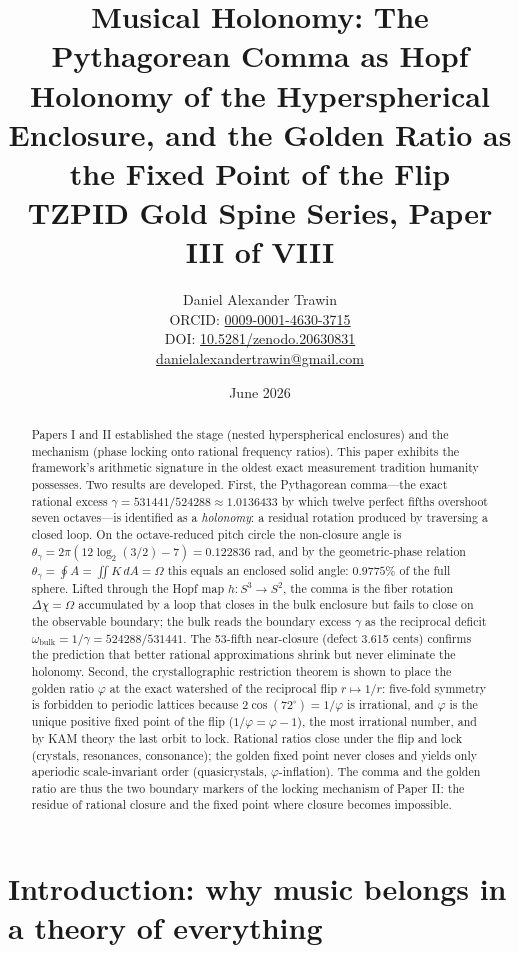 \documentclass[11pt]{article}
\title{Musical Holonomy: The Pythagorean Comma as Hopf Holonomy of the Hyperspherical Enclosure, and the Golden Ratio as the Fixed Point of the Flip\\[0.6em]
\large TZPID Gold Spine Series, Paper III of VIII}
\author{Daniel Alexander Trawin\\
\small ORCID: \href{https://orcid.org/0009-0001-4630-3715}{0009-0001-4630-3715}\\
\small DOI: \href{https://doi.org/10.5281/zenodo.20630831}{10.5281/zenodo.20630831}\\
\small \href{mailto:danielalexandertrawin@gmail.com}{danielalexandertrawin@gmail.com}}
\date{June 2026}
\theoremstyle{remark}
\begin{document}
\maketitle

\begin{abstract}
Papers I and II established the stage (nested hyperspherical enclosures) and the mechanism (phase locking onto rational frequency ratios). This paper exhibits the framework's arithmetic signature in the oldest exact measurement tradition humanity possesses. Two results are developed. First, the Pythagorean comma---the exact rational excess $\gamma = 531441/524288 \approx 1.0136433$ by which twelve perfect fifths overshoot seven octaves---is identified as a \emph{holonomy}: a residual rotation produced by traversing a closed loop. On the octave-reduced pitch circle the non-closure angle is $\theta_\gamma = 2\pi(12\log_2(3/2) - 7) = 0.122836$ rad, and by the geometric-phase relation $\theta_\gamma = \oint A = \iint K\, dA = \Omega$ this equals an enclosed solid angle: $0.9775\%$ of the full sphere. Lifted through the Hopf map $h: S^3 \to S^2$, the comma is the fiber rotation $\Delta\chi = \Omega$ accumulated by a loop that closes in the bulk enclosure but fails to close on the observable boundary; the bulk reads the boundary excess $\gamma$ as the reciprocal deficit $\omega_{\mathrm{bulk}} = 1/\gamma = 524288/531441$. The 53-fifth near-closure (defect 3.615 cents) confirms the prediction that better rational approximations shrink but never eliminate the holonomy. Second, the crystallographic restriction theorem is shown to place the golden ratio $\varphi$ at the exact watershed of the reciprocal flip $r \mapsto 1/r$: five-fold symmetry is forbidden to periodic lattices because $2\cos(72^\circ) = 1/\varphi$ is irrational, and $\varphi$ is the unique positive fixed point of the flip ($1/\varphi = \varphi - 1$), the most irrational number, and by KAM theory the last orbit to lock. Rational ratios close under the flip and lock (crystals, resonances, consonance); the golden fixed point never closes and yields only aperiodic scale-invariant order (quasicrystals, $\varphi$-inflation). The comma and the golden ratio are thus the two boundary markers of the locking mechanism of Paper II: the residue of rational closure and the fixed point where closure becomes impossible.
\end{abstract}

\section{Introduction: why music belongs in a theory of everything}
\label{sec:intro}
\end{document}
